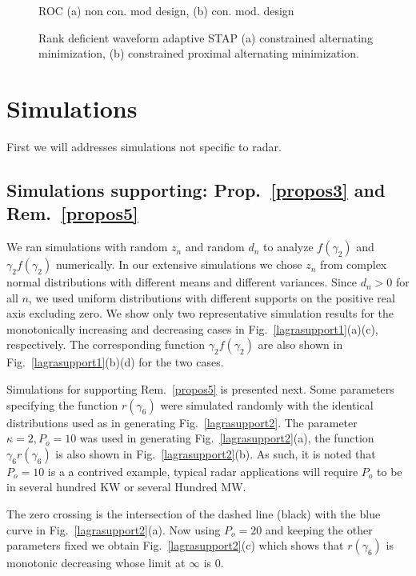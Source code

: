 \documentclass[11pt,draftclsnofoot,onecolumn]{IEEEtran}
\theoremstyle{definition}
\theoremstyle{remark}
\begin{document}
\begin{figure*}[htbp!]
\centering
\caption{ROC (a) non con. mod design, (b) con. mod. design }
\label{fig10}
\end{figure*}
\begin{figure*}[htbp!]
\centering
\caption{Rank deficient waveform adaptive STAP (a) constrained alternating minimization, (b) constrained proximal alternating minimization.}
\label{fig11}
\end{figure*}
\section{Simulations}\label{sec:simulations}
First we will addresses simulations not specific to radar.

\subsection{Simulations supporting: Prop.~\ref{propos3} and Rem.~\ref{propos5}}

We ran simulations with random $z_n$ and random $d_n$ to analyze $f(\gamma_2)$ and $\gamma_2f(\gamma_2)$ numerically.   In our extensive simulations we chose $z_n$ from complex normal distributions with different means and different variances. Since $d_n>0$ for all $n$, we used uniform distributions with different supports on the positive real axis excluding zero. We show only two representative simulation results for the monotonically increasing and decreasing cases in Fig.~\ref{lagrasupport1}(a)(c), respectively. The corresponding function $\gamma_2f(\gamma_2)$ are also shown in Fig.~\ref{lagrasupport1}(b)(d) for the two cases. 

Simulations for supporting Rem.~\ref{propos5} is presented next. Some parameters specifying the function $r(\gamma_6)$ were simulated randomly with the identical distributions used as in generating Fig.~\ref{lagrasupport2}. The parameter $\kappa=2,P_o=10$ was used in generating Fig.~\ref{lagrasupport2}(a), the function $\gamma_6r(\gamma_6)$ is also shown in Fig.~\ref{lagrasupport2}(b). As such, it is noted that $P_o=10$ is  a a contrived example, typical radar applications will require $P_o$ to be in several hundred KW or several Hundred MW. 

The zero crossing is the intersection of the dashed line (black) with the blue curve in Fig.~\ref{lagrasupport2}(a). Now using $P_o=20$ and keeping the other parameters fixed we obtain Fig.~\ref{lagrasupport2}(c) which shows that $r(\gamma_6)$ is monotonic decreasing whose limit at $\infty$ is 0. 
\end{document}
